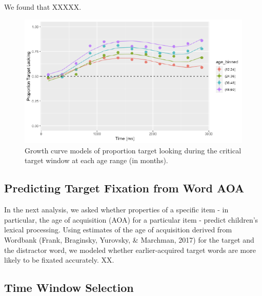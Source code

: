 \documentclass[10pt, letterpaper]{article}
\newenvironment{CodeChunk}{}{}
\begin{document}
We found that XXXXX.

\begin{CodeChunk}
\begin{figure}[H]

{\centering \includegraphics{figs/age_gca-1} 

}

\caption[Growth curve models of proportion target looking during the critical target window at each age range (in months)]{Growth curve models of proportion target looking during the critical target window at each age range (in months).}\label{fig:age_gca}
\end{figure}
\end{CodeChunk}

\hypertarget{predicting-target-fixation-from-word-aoa}{%
\subsection{Predicting Target Fixation from Word
AOA}\label{predicting-target-fixation-from-word-aoa}}

In the next analysis, we asked whether properties of a specific item -
in particular, the age of acquisition (AOA) for a particular item -
predict children's lexical processing. Using estimates of the age of
acquisition derived from Wordbank (Frank, Braginsky, Yurovsky, \&
Marchman, 2017) for the target and the distractor word, we modeled
whether earlier-acquired target words are more likely to be fixated
accurately. XX.

\hypertarget{time-window-selection}{%
\subsection{Time Window Selection}\label{time-window-selection}}
\end{document}
